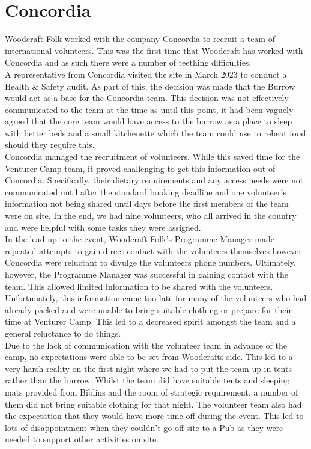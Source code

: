 \chapter{Concordia}
Woodcraft Folk worked with the company Concordia to recruit a team of international volunteers. This was the first time that Woodcraft has worked with Concordia and as such there were a number of teething difficulties.\\

A representative from Concordia visited the site in March 2023 to conduct a Health \& Safety audit. As part of this, the decision was made that the Burrow would act as a base for the Concordia team. This decision was not effectively communicated to the team at the time as until this point, it had been vaguely agreed that the core team would have access to the burrow as a place to sleep with better beds and a small kitchenette which the team could use to reheat food should they require this.\\

Concordia managed the recruitment of volunteers. While this saved time for the Venturer Camp team, it proved challenging to get this information out of Concordia. Specifically, their dietary requirements and any access needs were not communicated until after the standard booking deadline and one volunteer's information not being shared until days before the first members of the team were on site. In the end, we had nine volunteers, who all arrived in the country and were helpful with some tasks they were assigned. \\

In the lead up to the event, Woodcraft Folk's Programme Manager made repeated attempts to gain direct contact with the volunteers themselves however Concordia were reluctant to divulge the volunteers phone numbers. Ultimately, however, the Programme Manager was successful in gaining contact with the team. This allowed limited information to be shared with the volunteers. Unfortunately, this information came too late for many of the volunteers who had already packed and were unable to bring suitable clothing or prepare for their time at Venturer Camp. This led to a decreased spirit amongst the team and a general reluctance to do things.\\

Due to the lack of communication with the volunteer team in advance of the camp, no expectations were able to be set from Woodcrafts side. This led to a very harsh reality on the first night where we had to put the team up in tents rather than the burrow. Whilst the team did have suitable tents and sleeping mats provided from Biblins and the room of strategic requirement, a number of them did not bring suitable clothing for that night. The volunteer team also had the expectation that they would have more time off during the event. This led to lots of disappointment when they couldn't go off site to a Pub as they were needed to support other activities on site. \\

